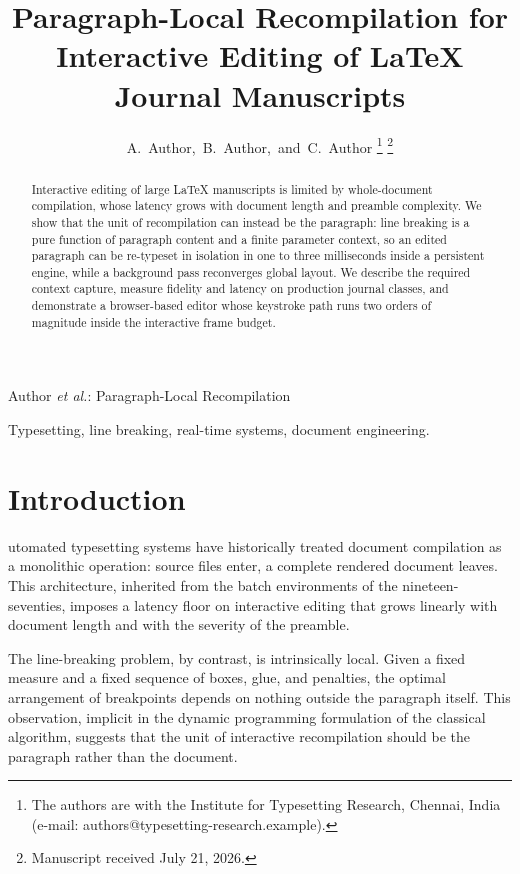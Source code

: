 \documentclass[journal]{IEEEtran}
\begin{document}
\title{Paragraph-Local Recompilation for Interactive
Editing of \LaTeX{} Journal Manuscripts}

\author{A.~Author,~B.~Author,~and~C.~Author%
\thanks{The authors are with the Institute for Typesetting Research,
Chennai, India (e-mail: authors@typesetting-research.example).}%
\thanks{Manuscript received July 21, 2026.}}

%
{Author \MakeLowercase{\textit{et al.}}: Paragraph-Local Recompilation}

\maketitle

\begin{abstract}
Interactive editing of large \LaTeX{} manuscripts is limited by
whole-document compilation, whose latency grows with document length and
preamble complexity. We show that the unit of recompilation can instead be
the paragraph: line breaking is a pure function of paragraph content and a
finite parameter context, so an edited paragraph can be re-typeset in
isolation in one to three milliseconds inside a persistent engine, while a
background pass reconverges global layout. We describe the required context
capture, measure fidelity and latency on production journal classes, and
demonstrate a browser-based editor whose keystroke path runs two orders of
magnitude inside the interactive frame budget.
\end{abstract}

\begin{IEEEkeywords}
Typesetting, line breaking, real-time systems, document engineering.
\end{IEEEkeywords}

\section{Introduction}

\tagStructPara{}utomated typesetting systems have historically treated
document compilation as a monolithic operation: source files enter, a
complete rendered document leaves. This architecture, inherited from the
batch environments of the nineteen-seventies, imposes a latency floor on
interactive editing that grows linearly with document length and with the
severity of the preamble.\tagStructParaEnd{}%

\tagStructPara{}The line-breaking problem, by contrast, is intrinsically local. Given a
fixed measure and a fixed sequence of boxes, glue, and penalties, the
optimal arrangement of breakpoints depends on nothing outside the paragraph
itself. This observation, implicit in the dynamic programming formulation
of the classical algorithm, suggests that the unit of interactive
recompilation should be the paragraph rather than the document.\tagStructParaEnd{}%
\end{document}
